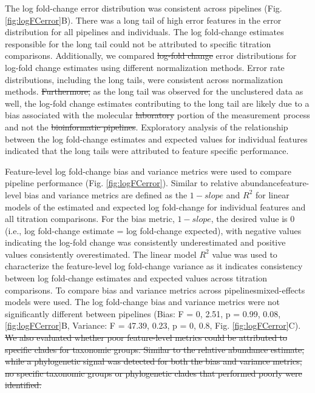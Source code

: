 \documentclass[linenumbers]{bmcart}
\providecommand{\DIFaddtex}[1]{{\protect\color{blue}\uwave{#1}}} %
\providecommand{\DIFdeltex}[1]{{\protect\color{red}\sout{#1}}}                      %
\providecommand{\DIFaddbegin}{} %
\providecommand{\DIFaddend}{} %
\providecommand{\DIFdelbegin}{} %
\providecommand{\DIFdelend}{} %
\providecommand{\DIFadd}[1]{\texorpdfstring{\DIFaddtex{#1}}{#1}} %
\providecommand{\DIFdel}[1]{\texorpdfstring{\DIFdeltex{#1}}{}} %
\begin{document}
The log fold-change error distribution was consistent across pipelines
(Fig. \ref{fig:logFCerror}B). There was a long tail of high error
features in the error distribution for all pipelines and individuals.
The log fold-change estimates responsible for the long tail could not be
attributed to specific titration comparisons. Additionally, we compared
\DIFdelbegin \DIFdel{log-fold change }\DIFdelend error distributions for log-fold change estimates using
different normalization methods. Error rate distributions, including the
long tails, were consistent across normalization methods. \DIFdelbegin \DIFdel{Furthermore,
}\DIFdelend \DIFaddbegin \DIFadd{Seeing
}\DIFaddend as the long tail was observed for the unclustered data as well, the
log-fold change estimates contributing to the long tail are likely due
to a bias associated with the molecular \DIFdelbegin \DIFdel{laboratory }\DIFdelend portion of the
measurement process and not the \DIFdelbegin \DIFdel{bioinformatic pipelines}\DIFdelend \DIFaddbegin \DIFadd{computational portion}\DIFaddend . Exploratory
analysis of the relationship between the log fold-change estimates and
expected values for individual features indicated that the long tails
were attributed to feature specific performance.

Feature-level log fold-change bias and variance metrics were used to
compare pipeline performance (Fig. \ref{fig:logFCerror}). Similar to
relative abundance\DIFaddbegin \DIFadd{, }\DIFaddend feature-level bias and variance metrics are defined
as the \(1 - slope\) and \(R^2\) for linear models of the estimated and
expected log fold-change for individual features and all titration
comparisons. For the bias metric, \(1 - slope\), the desired value is 0
(i.e., log fold-change estimate = log fold-change expected), with
negative values indicating the log-fold change was consistently
underestimated and positive values consistently overestimated. The
linear model \(R^2\) value was used to characterize the feature-level
log fold-change variance as it indicates consistency between log
fold-change estimates and expected values across titration comparisons.
To compare bias and variance metrics across pipelines\DIFaddbegin \DIFadd{, }\DIFaddend mixed-effects
models were used. The log fold-change bias and variance metrics were not
significantly different between pipelines (Bias: F = 0, 2.51, p = 0.99,
0.08, \ref{fig:logFCerror}B, Variance: F = 47.39, 0.23, p = 0, 0.8, Fig.
\ref{fig:logFCerror}C).
\DIFdelbegin \DIFdel{We also evaluated whether poor feature-level
metrics could be attributed to specific clades for taxonomic groups.
Similar to the relative abundance estimate, while a phylogenetic signal
was detected for both the bias and variance metrics, no specific
taxonomic groups or phylogenetic clades that performed poorly were
identified. }\DIFdelend 
\end{document}
